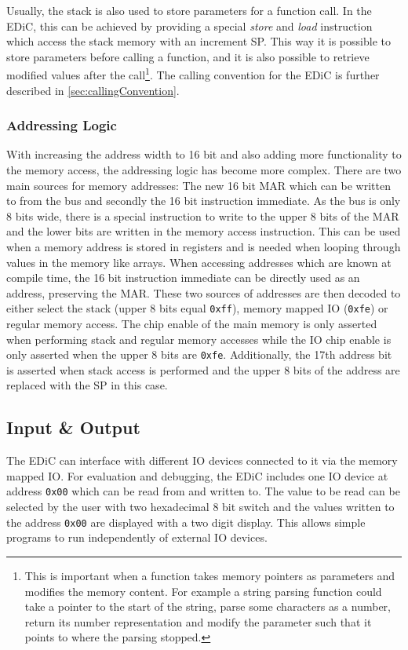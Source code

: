 Usually, the stack is also used to store parameters for a function call.
In the \gls{EDiC}, this can be achieved by providing a special \emph{store} and \emph{load} instruction which access the stack memory with an increment \gls{SP}.
This way it is possible to store parameters before calling a function, and it is also possible to retrieve modified values after the call\footnote{This is important when a function takes memory pointers as parameters and modifies the memory content. For example a string parsing function could take a pointer to the start of the string, parse some characters as a number, return its number representation and modify the parameter such that it points to where the parsing stopped.}.
The calling convention for the \gls{EDiC} is further described in \cref{sec:callingConvention}.

\subsubsection{Addressing Logic}\label{sec:addrLogic}
With increasing the address width to 16 bit and also adding more functionality to the memory access, the addressing logic has become more complex.
There are two main sources for memory addresses: The new 16 bit \gls{MAR} which can be written to from the bus and secondly the 16 bit instruction immediate.
As the bus is only 8 bits wide, there is a special instruction to write to the upper 8 bits of the \gls{MAR} and the lower bits are written in the memory access instruction.
This can be used when a memory address is stored in registers and is needed when looping through values in the memory like arrays.
When accessing addresses which are known at compile time, the 16 bit instruction immediate can be directly used as an address, preserving the \gls{MAR}.
These two sources of addresses are then decoded to either select the stack (upper 8 bits equal \texttt{0xff}), memory mapped \gls{IO} (\texttt{0xfe}) or regular memory access.
The chip enable of the main memory is only asserted when performing stack and regular memory accesses while the \gls{IO} chip enable is only asserted when the upper 8 bits are \texttt{0xfe}.
Additionally, the 17th address bit is asserted when stack access is performed and the upper 8 bits of the address are replaced with the \gls{SP} in this case.

\subsection{Input \& Output}\label{sec:IO}
The \gls{EDiC} can interface with different \gls{IO} devices connected to it via the memory mapped \gls{IO}.
For evaluation and debugging, the \gls{EDiC} includes one \gls{IO} device at address \texttt{0x00} which can be read from and written to.
The value to be read can be selected by the user with two hexadecimal 8 bit switch and the values written to the address \texttt{0x00} are displayed with a two digit display.
This allows simple programs to run independently of external \gls{IO} devices.

